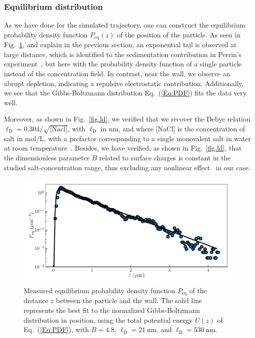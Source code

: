 \subsubsection{Equilibrium distribution}

As we have done for the simulated trajectory, one can construct the equilibrium probability density function $P_\mathrm{eq}(z)$ of the position of the particle. As seen in Fig.~\ref{fig.pdf_exp}, and explain in the previous section, an exponential tail is observed at large distance, which is identified to the sedimentation contribution in Perrin's experiment~\cite{perrin_les_2014}, but here with the probability density function of a single particle instead of the concentration field. In contrast, near the wall, we observe an abrupt depletion, indicating a repulsive electrostatic contribution. Additionally, we see that the Gibbs-Boltzmann distribution Eq.~(\ref{Eq:PDF}) fits the data very well.



Moreover, as shown in Fig.~\ref{fig.ld}, we verified that we recover the Debye relation $\ell_{\mathrm{D}}=0.304/\sqrt{\textrm{[Nacl]}}$, with $\ell_{\mathrm{D}}$ in nm, and where [NaCl] is the concentration of salt in mol/L, with a prefactor corresponding to a single monovalent salt in water at room temperature~\cite{israelachvili_intermolecular_2015}. Besides, we have verified, as shown in Fig.~\ref{fig.ld}, that the dimensionless parameter $B$ related to surface charges is constant in the studied salt-concentration range, thus excluding any nonlinear effect~\cite{wang_measurement_2011,oberholzer_grand_1997} in our case. 

\begin{figure}[h!]
	\centering
	\includegraphics{02_body/chapter3/images/trajctory_analysis/pdf_exp.pdf}
	\caption{Measured equilibrium probability density function $P_{\textrm{eq}}$ of the distance $z$ between the particle and the wall. The solid line represents the best fit to the normalized Gibbs-Boltzmann distribution in position, using the total potential energy $U(z)$ of Eq.~(\ref{Eq:PDF}), with $B = 4.8$, $\ell_\mathrm{D} = 21 ~ \mathrm{nm}$, and $\ell_\mathrm{B} = 530~ \mathrm{nm}$.}
	\label{fig.pdf_exp}
\end{figure}


